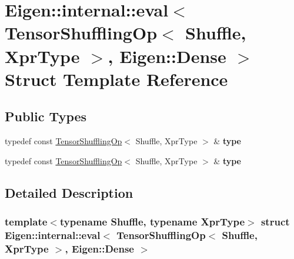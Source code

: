 \hypertarget{struct_eigen_1_1internal_1_1eval_3_01_tensor_shuffling_op_3_01_shuffle_00_01_xpr_type_01_4_00_01_eigen_1_1_dense_01_4}{}\section{Eigen\+:\+:internal\+:\+:eval$<$ Tensor\+Shuffling\+Op$<$ Shuffle, Xpr\+Type $>$, Eigen\+:\+:Dense $>$ Struct Template Reference}
\label{struct_eigen_1_1internal_1_1eval_3_01_tensor_shuffling_op_3_01_shuffle_00_01_xpr_type_01_4_00_01_eigen_1_1_dense_01_4}
\subsection*{Public Types}
\begin{DoxyCompactItemize}
\item 
\mbox{\label{struct_eigen_1_1internal_1_1eval_3_01_tensor_shuffling_op_3_01_shuffle_00_01_xpr_type_01_4_00_01_eigen_1_1_dense_01_4_aa646214bef26c3f0d0562c1c370b9c4b}} 
typedef const \hyperlink{class_eigen_1_1_tensor_shuffling_op}{Tensor\+Shuffling\+Op}$<$ Shuffle, Xpr\+Type $>$ \& {\bfseries type}
\item 
\mbox{\label{struct_eigen_1_1internal_1_1eval_3_01_tensor_shuffling_op_3_01_shuffle_00_01_xpr_type_01_4_00_01_eigen_1_1_dense_01_4_aa646214bef26c3f0d0562c1c370b9c4b}} 
typedef const \hyperlink{class_eigen_1_1_tensor_shuffling_op}{Tensor\+Shuffling\+Op}$<$ Shuffle, Xpr\+Type $>$ \& {\bfseries type}
\end{DoxyCompactItemize}


\subsection{Detailed Description}
\subsubsection*{template$<$typename Shuffle, typename Xpr\+Type$>$\newline
struct Eigen\+::internal\+::eval$<$ Tensor\+Shuffling\+Op$<$ Shuffle, Xpr\+Type $>$, Eigen\+::\+Dense $>$}




